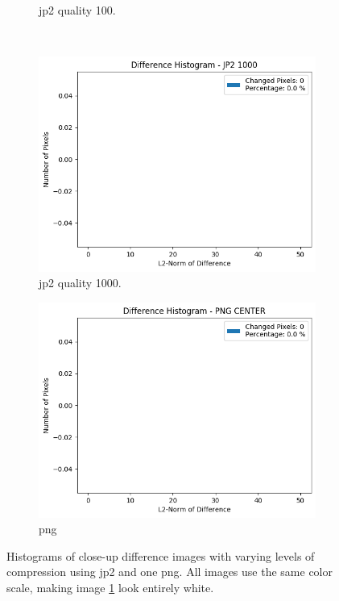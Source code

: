 \begin{figure}[htb]
\begin{subfigure}[b]{0.49\textwidth}
            \caption{\gls{jp2} quality 100.}
            \label{fig:img_quality_center_histogram_100}
        \end{subfigure}
        \\
        \begin{subfigure}[b]{0.49\textwidth}
            \centering
            \includegraphics[width=\textwidth]{doc/thesis/0_figures/compare_quality/set1/jp2_1000_center_diff_histogram.png}
            \caption{\gls{jp2} quality 1000.}
            \label{fig:img_quality_center_histogram_1000}
        \end{subfigure}
        \begin{subfigure}[b]{0.49\textwidth}
            \centering
            \includegraphics[width=\textwidth]{doc/thesis/0_figures/compare_quality/set1/png_center_diff_histogram.png}
            \caption{\gls{png}}
            \label{fig:img_quality_center_histogram_png}
        \end{subfigure}
    \caption{Histograms of close-up difference images with varying levels of compression using \gls{jp2} and one \gls{png}. All images use the same color scale, making image \ref{fig:img_quality_center_histogram_100} look entirely white.}
    \label{fig:img_quality_center_histogram}
\end{figure}

